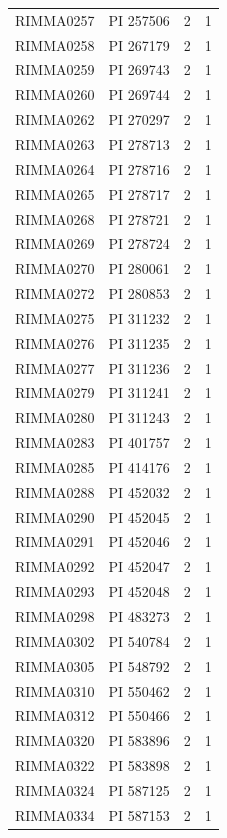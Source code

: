 \documentclass[11pt]{article}
\newcounter{rowno}
\begin{document}
\begin{scriptsize}
\begin{longtable}{>{\stepcounter{rowno}}cccc}
    RIMMA0257 & PI	257506 & 2     & 1 \\
    RIMMA0258 & PI 267179 & 2     & 1 \\
    RIMMA0259 & PI 269743 & 2     & 1 \\
    RIMMA0260 & PI 269744 & 2     & 1 \\
    RIMMA0262 & PI 270297 & 2     & 1 \\
    RIMMA0263 & PI 278713 & 2     & 1 \\
    RIMMA0264 & PI 278716 & 2     & 1 \\
    RIMMA0265 & PI 278717 & 2     & 1 \\
    RIMMA0268 & PI 278721 & 2     & 1 \\
    RIMMA0269 & PI 278724 & 2     & 1 \\
    RIMMA0270 & PI 280061 & 2     & 1 \\
    RIMMA0272 & PI 280853 & 2     & 1 \\
    RIMMA0275 & PI 311232 & 2     & 1 \\
    RIMMA0276 & PI 311235 & 2     & 1 \\
    RIMMA0277 & PI 311236 & 2     & 1 \\
    RIMMA0279 & PI 311241 & 2     & 1 \\
    RIMMA0280 & PI 311243 & 2     & 1 \\
    RIMMA0283 & PI 401757 & 2     & 1 \\
    RIMMA0285 & PI 414176 & 2     & 1 \\
    RIMMA0288 & PI 452032 & 2     & 1 \\
    RIMMA0290 & PI 452045 & 2     & 1 \\
    RIMMA0291 & PI 452046 & 2     & 1 \\
    RIMMA0292 & PI 452047 & 2     & 1 \\
    RIMMA0293 & PI 452048 & 2     & 1 \\
    RIMMA0298 & PI 483273 & 2     & 1 \\
    RIMMA0302 & PI 540784 & 2     & 1 \\
    RIMMA0305 & PI 548792 & 2     & 1 \\
    RIMMA0310 & PI 550462 & 2     & 1 \\
    RIMMA0312 & PI 550466 & 2     & 1 \\
    RIMMA0320 & PI 583896 & 2     & 1 \\
    RIMMA0322 & PI 583898 & 2     & 1 \\
    RIMMA0324 & PI 587125 & 2     & 1 \\
    RIMMA0334 & PI 587153 & 2     & 1 \\

\end{longtable}
\end{scriptsize}
\end{document}
